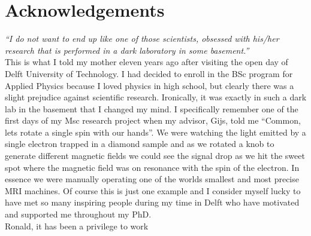 \documentclass{report}
\begin{document}
\chapter{Acknowledgements}

\textit{``I do not want to end up like one of those scientists, obsessed with his/her research that is performed in a dark laboratory in some basement.''}
\\

This is what I told my mother eleven years ago after visiting the open day of Delft University of Technology. I had decided to enroll in the BSc program for Applied Physics because I loved physics in high school, but clearly there was a slight prejudice against scientific research. Ironically, it was exactly in such a dark lab in the basement that I changed my mind. I specifically remember one of the first days of my Msc research project when my advisor, Gijs, told me  ``Common, lets rotate a single spin with our hands''. We were watching the light emitted by a single electron trapped in a diamond sample and as we rotated a knob to generate different magnetic fields we could see the signal drop as we hit the sweet spot where the magnetic field was on resonance with the spin of the electron. In essence we were manually operating one of the worlds smallest and most precise MRI machines.
Of course this is just one example and I consider myself lucky to have met so many inspiring people during my time in Delft who have motivated and supported me throughout my PhD.\\

Ronald, it has been a privilege to work
\end{document}
